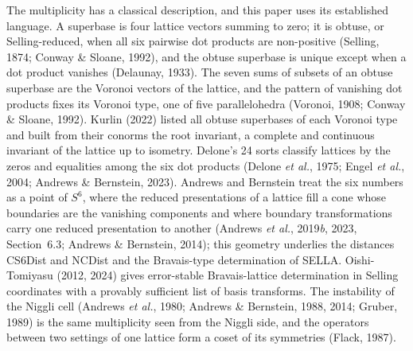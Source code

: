 The multiplicity has a classical description, and this paper uses its established language. A superbase is four lattice vectors summing to zero; it is obtuse, or Selling-reduced, when all six pairwise dot products are non-positive (Selling, 1874; Conway \& Sloane, 1992), and the obtuse superbase is unique except when a dot product vanishes (Delaunay, 1933). The seven sums of subsets of an obtuse superbase are the Voronoi vectors of the lattice, and the pattern of vanishing dot products fixes its Voronoi type, one of five parallelohedra (Voronoi, 1908; Conway \& Sloane, 1992). Kurlin (2022) listed all obtuse superbases of each Voronoi type and built from their conorms the root invariant, a complete and continuous invariant of the lattice up to isometry. Delone's 24 sorts classify lattices by the zeros and equalities among the six dot products (Delone \emph{et al.}, 1975; Engel \emph{et al.}, 2004; Andrews \& Bernstein, 2023). Andrews and Bernstein treat the six numbers as a point of $S^6$, where the reduced presentations of a lattice fill a cone whose boundaries are the vanishing components and where boundary transformations carry one reduced presentation to another (Andrews \emph{et al.}, 2019\emph{b}, 2023, Section~6.3; Andrews \& Bernstein, 2014); this geometry underlies the distances CS6Dist and NCDist and the Bravais-type determination of SELLA. Oishi-Tomiyasu (2012, 2024) gives error-stable Bravais-lattice determination in Selling coordinates with a provably sufficient list of basis transforms. The instability of the Niggli cell (Andrews \emph{et al.}, 1980; Andrews \& Bernstein, 1988, 2014; Gruber, 1989) is the same multiplicity seen from the Niggli side, and the operators between two settings of one lattice form a coset of its symmetries (Flack, 1987).

